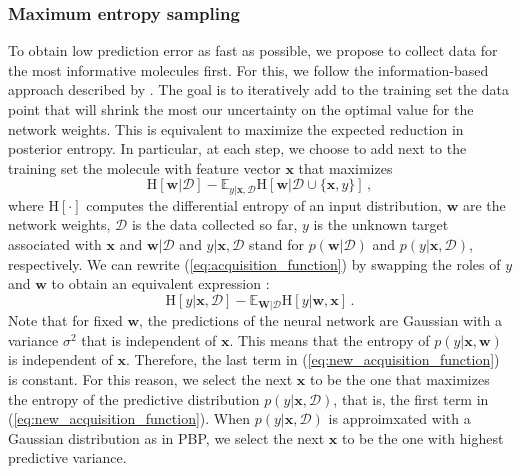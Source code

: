 \subsubsection{Maximum entropy sampling}

To obtain low prediction error as fast as possible, we propose to collect data for the most informative molecules first. For this, we follow the information-based approach described by \cite{MacKay_1992}. The goal is to iteratively add to the training set the data point that will shrink the most our uncertainty on the optimal value for the network weights. This is equivalent to maximize the expected reduction in posterior entropy. In particular, at each step, we choose to add next to the training set the molecule with feature vector $\mathbf{x}$ that maximizes
\begin{equation}
\text{H}[\mathbf{w}|\mathcal{D}]  - 
\mathbb{E}_{y|\mathbf{x},\mathcal{D}}\text{H}[\mathbf{w}|\mathcal{D}\cup\{\mathbf{x},y\}]\,,\label{eq:acquisition_function}
\end{equation}
where $\text{H}[\cdot]$ computes the differential entropy of an input distribution, $\mathbf{w}$ are the network weights, $\mathcal{D}$ is the data collected so far, $y$ is the unknown target associated with $\mathbf{x}$ and $\mathbf{w}|\mathcal{D}$ and $y|\mathbf{x},\mathcal{D}$ stand for $p(\mathbf{w}|\mathcal{D})$ and $p(y|\mathbf{x},\mathcal{D})$, respectively. We can rewrite (\ref{eq:acquisition_function}) by swapping the roles of $y$ and $\mathbf{w}$ to obtain an equivalent expression \cite{houlsby2012collaborative}:
\begin{equation}
\text{H}[y | \mathbf{x},\mathcal{D}] - 
\mathbb{E}_{\mathbf{W} | \mathcal{D}}\text{H}[y | \mathbf{w},\mathbf{x}]\,.\label{eq:new_acquisition_function}
\end{equation}
Note that for fixed $\mathbf{w}$, the predictions of the neural network are Gaussian with a variance $\sigma^2$ that is independent of $\mathbf{x}$. This means that the entropy of $p(y| \mathbf{x},\mathbf{w})$ is independent of $\mathbf{x}$.
Therefore, the last term in (\ref{eq:new_acquisition_function}) is constant.
For this reason, we select the next $\mathbf{x}$ to be the one that maximizes the entropy of the predictive distribution $p(y| \mathbf{x},\mathcal{D})$, that is, the first term in (\ref{eq:new_acquisition_function}). When $p(y| \mathbf{x},\mathcal{D})$ is approimxated with a Gaussian distribution as in PBP, we select the next $\mathbf{x}$ to be the one with highest predictive variance.
